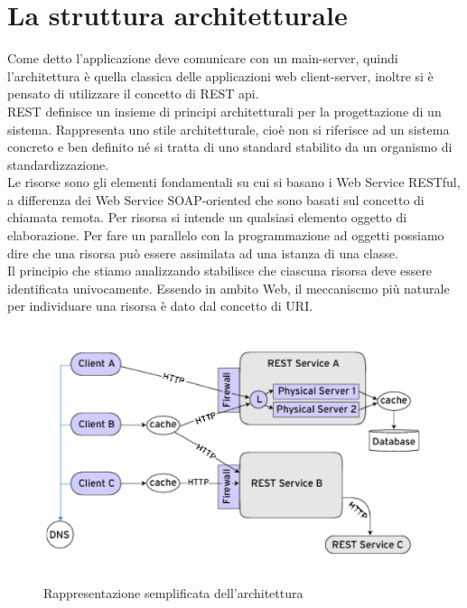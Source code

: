 \section{La struttura architetturale}
Come detto l'applicazione deve comunicare con un main-server, quindi l'architettura è quella classica delle applicazioni web client-server, inoltre si è pensato di utilizzare il concetto di REST api.\\
REST \cite{REST} definisce un insieme di principi architetturali per la progettazione di un sistema. Rappresenta uno stile architetturale, cioè non si riferisce ad un sistema concreto e ben definito né si tratta di uno standard stabilito da un organismo di standardizzazione. \\ 
Le risorse sono gli elementi fondamentali su cui si basano i Web Service RESTful, a differenza dei Web Service SOAP-oriented che sono basati sul concetto di chiamata remota. Per risorsa si intende un qualsiasi elemento oggetto di elaborazione. Per fare un parallelo con la programmazione ad oggetti possiamo dire che una risorsa può essere assimilata ad una istanza di una classe.\\
Il principio che stiamo analizzando stabilisce che ciascuna risorsa deve essere identificata univocamente. Essendo in ambito Web, il meccaniscmo più naturale per individuare una risorsa è dato dal concetto di URI. \\
\begin{figure}[H]
	\centering
	\includegraphics[scale=0.5]{Implementazione/rest.png}
	\caption{Rappresentazione semplificata dell'architettura }
	\label{fig:rest}
\end{figure}

